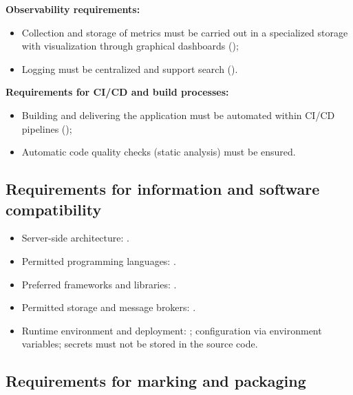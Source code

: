 \documentclass[12pt,a4paper]{extarticle}
\begin{document}
\textbf{Observability requirements:}

\begin{itemize}[leftmargin=1.25cm]
\item Collection and storage of metrics must be carried out in a specialized storage with visualization through graphical dashboards ();
\item Logging must be centralized and support search ().
\end{itemize}

\textbf{Requirements for CI/CD and build processes:}

\begin{itemize}[leftmargin=1.25cm]
\item Building and delivering the application must be automated within CI/CD pipelines ();
\item Automatic code quality checks (static analysis) must be ensured.
\end{itemize}

\subsection{Requirements for information and software compatibility}

\begin{itemize}[leftmargin=1.25cm]
\item Server-side architecture: .
\item Permitted programming languages: .
\item Preferred frameworks and libraries: .
\item Permitted storage and message brokers: .
\item Runtime environment and deployment: ; configuration via environment variables; secrets must not be stored in the source code.
\end{itemize}

\subsection{Requirements for marking and packaging}
\end{document}
